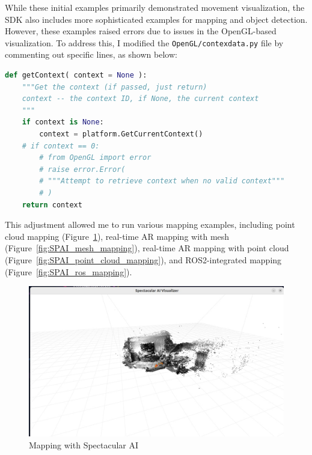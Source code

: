 While these initial examples primarily demonstrated movement visualization, the SDK also includes more sophisticated examples for mapping and object detection. However, these examples raised errors due to issues in the OpenGL-based visualization. To address this, I modified the \verb|OpenGL/contexdata.py| file by commenting out specific lines, as shown below:

\begin{lstlisting}[language=python,frame=single,float=!ht]
def getContext( context = None ):
    """Get the context (if passed, just return)
    context -- the context ID, if None, the current context
    """
    if context is None:
        context = platform.GetCurrentContext()
    # if context == 0:
        # from OpenGL import error
        # raise error.Error(
        # """Attempt to retrieve context when no valid context"""
        # )
    return context
\end{lstlisting}
\FloatBarrier

This adjustment allowed me to run various mapping examples, including point cloud mapping (Figure~\ref{fig:SPAI_mapping}), real-time AR mapping with mesh (Figure~\ref{fig:SPAI_mesh_mapping}), real-time AR mapping with point cloud (Figure~\ref{fig:SPAI_point_cloud_mapping}), and ROS2-integrated mapping (Figure~\ref{fig:SPAI_ros_mapping}).

\begin{figure}[htbp]
	\centering
	\includegraphics[width=150mm, keepaspectratio]{figures_jpg/spectacular_ai_mapping_visu.jpg}
	\caption{Mapping with Spectacular AI}
	\label{fig:SPAI_mapping}
\end{figure}

